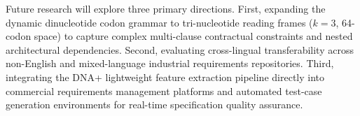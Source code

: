 Future research will explore three primary directions. First, expanding the dynamic dinucleotide codon grammar to tri-nucleotide reading frames ($k=3$, 64-codon space) to capture complex multi-clause contractual constraints and nested architectural dependencies. Second, evaluating cross-lingual transferability across non-English and mixed-language industrial requirements repositories. Third, integrating the DNA+ lightweight feature extraction pipeline directly into commercial requirements management platforms and automated test-case generation environments for real-time specification quality assurance.
